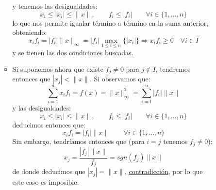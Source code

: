 \begin{ejercicio}
\begin{enumerate}[label=\alph*)]
\begin{description}
\begin{itemize}
\begin{equation*}
                            \end{equation*}
                            y tenemos las desigualdades:
                            \begin{equation*}
                                x_i \leq |x_i| \leq \|x\|, \qquad f_i \leq |f_i| \qquad \forall i \in \{1,\ldots,n\}
                            \end{equation*}
                            lo que nos permite igualar término a término en la suma anterior, obteniendo:
                            \begin{equation*}
                                x_if_i = |f_i|\|x\|_\infty = |f_i| \max_{1\leq i\leq n}\{|x_i|\} \Longrightarrow x_if_i \geq 0 \quad \forall i \in I
                            \end{equation*}
                            y se tienen las dos condiciones buscadas.
                        \item Si suponemos ahora que existe $f_j\neq 0$ para $j\notin I$, tendremos entonces que $|x_j|<\|x\|$. Si observamos que:
                            \begin{equation*}
                                \sum_{i=1}^{n}x_if_i = f(x) = \|x\|_\infty^2 = \sum_{i=1}^{n}|f_i|\|x\|
                            \end{equation*}
                            y las desigualdades:
                            \begin{equation*}
                                x_i\leq |x_i|\leq \|x\|, \qquad f_i\leq |f_i| \qquad \forall i \in \{1,\ldots,n\}
                            \end{equation*}
                            deducimos entonces que:
                            \begin{equation*}
                                x_if_i = |f_i|\|x\| \qquad \forall i \in \{1,\ldots,n\}
                            \end{equation*}
                            Sin embargo, tendríamos entonces que (para $i=j$ tenemos $f_j\neq 0$):
                            \begin{equation*}
                                x_j = \dfrac{|f_j|\|x\|}{f_j}= sgn(f_j)\|x\| 
                            \end{equation*}
                            de donde deducimos que $|x_j| = \|x\|$, \underline{contradicción}, por lo que este caso es imposible.
                    \end{itemize}
            \end{description}

\end{enumerate}
\end{ejercicio}
